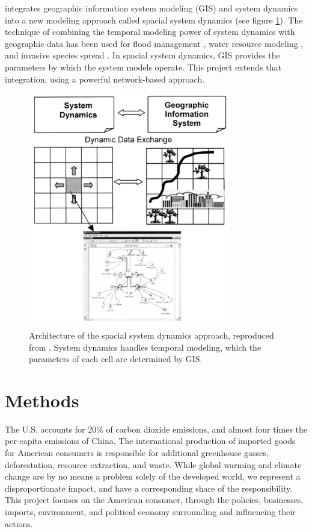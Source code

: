 \documentclass[12pt, oneside]{amsart}
\begin{document}
\cite{ahmad2004spatial} integrates geographic information system modeling (GIS) and system dynamics into a new modeling approach called spacial system dynamics (see figure \ref{fig:ssdarch}).  The technique of combining the temporal modeling power of system dynamics with geographic data has been used for flood management \citep{ahmad2006intelligent}, water resource modeling \citep{vivoni2009semiarid, roach2009compartmental}, and invasive species spread \citep{bendor2006spatial}.  In spacial system dynamics, GIS provides the parameters by which the system models operate.  This project extends that integration, using a powerful network-based approach.
\begin{figure}[htb]
\includegraphics[width=3.5in]{ssdarch.png}
\caption{Architecture of the spacial system dynamics approach, reproduced from \cite{ahmad2004spatial}.  System dynamics handles temporal modeling, which the parameters of each cell are determined by GIS.}
\label{fig:ssdarch}
\end{figure}

\section{Methods}

The U.S. accounts for 20\% of carbon dioxide emissions, and almost four times the per-capita emissions of China.  The international production of imported goods for American consumers is responsible for additional greenhouse gasses, deforestation, resource extraction, and waste.  While global warming and climate change are by no means a problem solely of the developed world, we represent a disproportionate impact, and have a corresponding share of the responsibility.  This project focuses on the American consumer, through the policies, businesses, imports, environment, and political economy surrounding and influencing their actions.
\end{document}
